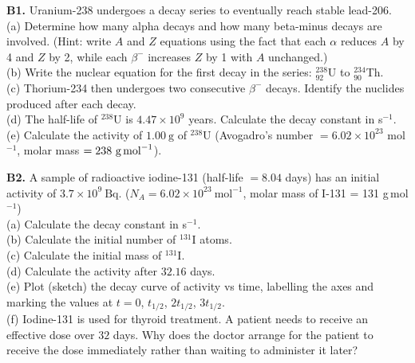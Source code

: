 \begin{exercisebox}[28]
\textbf{B1.} Uranium-238 undergoes a decay series
to eventually reach stable lead-206.\\[4pt]
(a) Determine how many alpha decays and how many
beta-minus decays are involved. (Hint: write $A$
and $Z$ equations using the fact that each
$\alpha$ reduces $A$ by 4 and $Z$ by 2, while
each $\beta^-$ increases $Z$ by 1 with $A$
unchanged.)\\
(b) Write the nuclear equation for the first decay
in the series: ${}^{238}_{92}$U to ${}^{234}_{90}$Th.\\
(c) Thorium-234 then undergoes two consecutive
$\beta^-$ decays. Identify the nuclides produced
after each decay.\\
(d) The half-life of ${}^{238}$U is $4.47\times10^9$
years. Calculate the decay constant in s$^{-1}$.\\
(e) Calculate the activity of $1.00\ \text{g}$ of
${}^{238}$U (Avogadro's number $= 6.02\times10^{23}$
mol$^{-1}$, molar mass $= 238\ \text{g\,mol}^{-1}$).
\hfill{}

\begin{center}
\end{center}

\vspace{0.4cm}

\textbf{B2.} A sample of radioactive iodine-131
(half-life $= 8.04$ days) has an initial activity
of $3.7\times10^9\ \text{Bq}$.
($N_A = 6.02\times10^{23}\ \text{mol}^{-1}$,
molar mass of I-131 = 131 g\,mol$^{-1}$)\\[4pt]
(a) Calculate the decay constant in s$^{-1}$.\\
(b) Calculate the initial number of ${}^{131}$I
atoms.\\
(c) Calculate the initial mass of ${}^{131}$I.\\
(d) Calculate the activity after $32.16$ days.\\
(e) Plot (sketch) the decay curve of activity vs
time, labelling the axes and marking the values
at $t = 0$, $t_{1/2}$, $2t_{1/2}$, $3t_{1/2}$.\\
(f) Iodine-131 is used for thyroid treatment. A
patient needs to receive an effective dose over
$32$ days. Why does the doctor arrange for the
patient to receive the dose immediately rather
than waiting to administer it later?
\hfill{}


\end{exercisebox}
